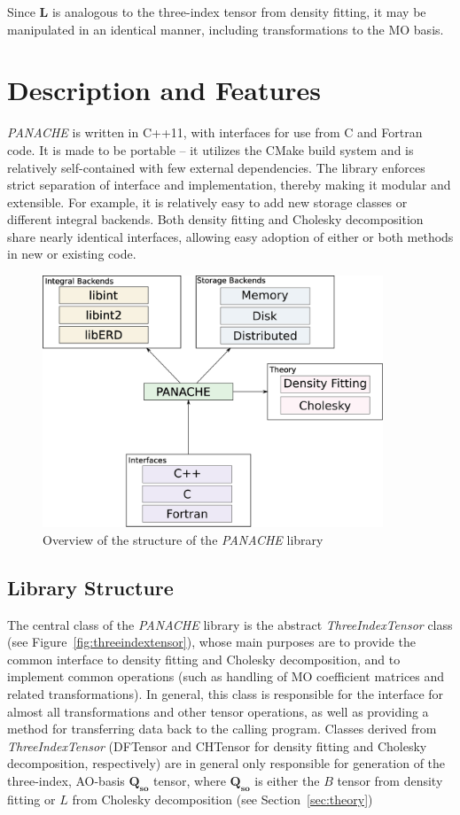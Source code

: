 \documentclass[12pt,letterpaper]{article}
\newcommand{\mat}[1]{\ensuremath{\bm{#1}}\xspace}
\newcommand{\ten}[1]{\ensuremath{\bm{#1}}\xspace}
\newcommand{\class}[1]{\textit{#1}\xspace}
\newcommand{\panache}{\textit{PANACHE}\xspace}
\newcommand{\Qso}{\ten{Q_{so}}}
\begin{document}
Since $\mat{L}$ is analogous to the three-index tensor from density fitting, 
it may be manipulated in an identical manner, including transformations to
the MO basis.


\section{Description and Features}
\label{sec:description}

\panache is written in C++11, with interfaces for use from C and Fortran
code. It is made to be portable -- it utilizes the CMake\cite{CMake} build system and
is relatively self-contained with few external dependencies.  The library
enforces strict separation of interface and implementation, thereby making
it modular and extensible. For example, it is relatively easy to add
new storage classes or different integral backends. Both density
fitting and Cholesky decomposition share nearly identical interfaces,
allowing easy adoption of either or both methods in new or existing code.


\begin{figure}
\centering
\includegraphics[width=4in]{images/panacheoverview}
\caption{Overview of the structure of the \panache library}
\end{figure}





\subsection{Library Structure}
\label{sec:structure}

The central class of the \panache library is the abstract
\class{ThreeIndexTensor} class (see Figure~\ref{fig:threeindextensor}),
whose main purposes are to provide the common interface to density fitting
and Cholesky decomposition, and to implement common operations (such as
handling of MO coefficient matrices and related transformations). In
general, this class is responsible for the interface for almost all
transformations and other tensor operations, as well as providing a method
for transferring data back to the calling program. Classes derived from
\class{ThreeIndexTensor} (DFTensor and CHTensor for density fitting and
Cholesky decomposition, respectively) are in general only responsible
for generation of the three-index, AO-basis \Qso tensor, where \Qso
is either the $B$ tensor from density fitting or $L$ from Cholesky
decomposition (see Section~\ref{sec:theory})
\end{document}
